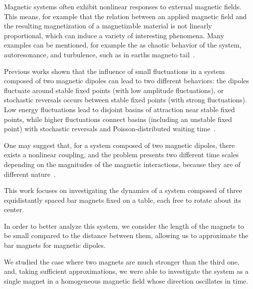 Magnetic systems often exhibit nonlinear responses to external magnetic fields. This means, for example that the relation between an applied magnetic field and the resulting magnetization of a magnetizable material is not linearly proportional, which can induce a variety of interesting phenomena. Many examples can be mentioned, for example the as chaotic behavior of the system, autoresonance, and turbulence, such as in earth\textquotesingle s magneto tail~\cite{nonlinearResponse,Bratman1983,Loeb1986,VerandaM,Brunton2017,Chang1999}. 


Previous works shown that the influence of small fluctuations in a system composed of two magnetic dipoles can lead to two different behaviors: the dipoles fluctuate around stable fixed points (with low amplitude fluctuations), or stochastic reversals occurs between stable fixed points (with strong fluctuations). Low energy fluctuations lead to disjoint basins of attraction near stable fixed points, while higher fluctuations connect basins (including an unstable fixed point) with stochastic reversals and Poisson-distributed waiting time~\cite{santos2019dinamica, StochasticReversalDynamics}. 

One may suggest that, for a system composed of two magnetic dipoles, there exists a nonlinear coupling, and the problem presents two different time scales depending on the magnitudes of the magnetic interactions, because they are of different nature~\cite{LAROZE20081440}.

This work focuses on investigating the dynamics of a system composed of three equidistantly spaced bar magnets fixed on a table, each free to rotate about its center. 

In order to better analyze this system, we consider the length of the magnets to be small compared to the distance between them, allowing us to approximate the bar magnets for magnetic dipoles.

We studied the case where two magnets are much stronger than the third one, and, taking sufficient approximations, we were able to investigate the system as a single magnet in a homogeneous magnetic field whose direction oscillates in time.

